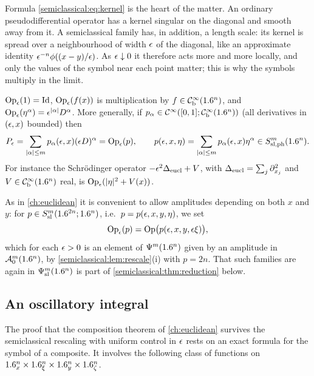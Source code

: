 \begin{discussion}
Formula \eqref{semiclassical:eq:kernel} is the heart of the matter. An
ordinary pseudodifferential operator has a kernel singular on the diagonal and
smooth away from it. A semiclassical family has, in addition, a length scale:
its kernel is spread over a neighbourhood of width $\epsilon$ of the diagonal,
like an approximate identity $\epsilon^{-n}\phi((x-y)/\epsilon)$. As $\epsilon\downarrow0$
it therefore acts more and more locally, and only the values of the symbol
near each point matter; this is why the symbols multiply in the limit.
\end{discussion}

\begin{example}\label{semiclassical:ex:differential}
  $\operatorname{Op}_\epsilon(1)=\operatorname{Id}$, $\operatorname{Op}_\epsilon(f(x))$ is multiplication by $f\in\mathcal{C}^\infty_{\mathrm{b}}(1.6^n)$, and
  $\operatorname{Op}_\epsilon(\eta^\alpha)=\epsilon^{\lvert \alpha\rvert}D^\alpha$. More generally, if
  $p_\alpha\in\mathcal{C}^\infty([0,1];\mathcal{C}^\infty_{\mathrm{b}}(1.6^n))$ (all derivatives in $(\epsilon,x)$ bounded) then
  \begin{equation*}
    P_\epsilon=\sum_{\lvert \alpha\rvert\le m}p_\alpha(\epsilon,x)(\epsilon D)^\alpha=\operatorname{Op}_\epsilon(p),\qquad
    p(\epsilon,x,\eta)=\sum_{\lvert \alpha\rvert\le m}p_\alpha(\epsilon,x)\eta^\alpha\in S^{m}_{\mathrm{sl,ph}}(1.6^n).
  \end{equation*}
  For instance the Schr\"odinger operator $-\epsilon^2\Delta_{\mathrm{eucl}}+V$,
  with $\Delta_{\mathrm{eucl}}=\sum_j\partial_{x_j}^2$ and $V\in\mathcal{C}^\infty_{\mathrm{b}}(1.6^n)$ real, is
  $\operatorname{Op}_\epsilon(\lvert \eta\rvert^2+V(x))$.
\end{example}

As in \cref{ch:euclidean} it is convenient to allow amplitudes depending on
both $x$ and $y$: for $p\in S^{m}_{\mathrm{sl}}(1.6^{2n};1.6^n)$, i.e.\ $p=p(\epsilon,x,y,\eta)$, we set
\begin{equation*}
  \operatorname{Op}_\epsilon(p)=\operatorname{Op}\bigl(p(\epsilon,x,y,\epsilon\xi)\bigr),
\end{equation*}
which for each $\epsilon>0$ is an element of $\Psi^{m}(1.6^n)$ given by an amplitude in
$\mathcal{A}^{m}_{0}(1.6^n)$, by \cref{semiclassical:lem:rescale}(i) with $p=2n$. That such
families are again in $\Psi^{m}_{\mathrm{sl}}(1.6^n)$ is part of
\cref{semiclassical:thm:reduction} below.

\subsection{An oscillatory integral}
The proof that the composition theorem of \cref{ch:euclidean} survives the
semiclassical rescaling with uniform control in $\epsilon$ rests on an exact
formula for the symbol of a composite. It involves the following class of
functions on $1.6^n_x\times1.6^n_\xi\times1.6^n_y\times1.6^n_\zeta$.

